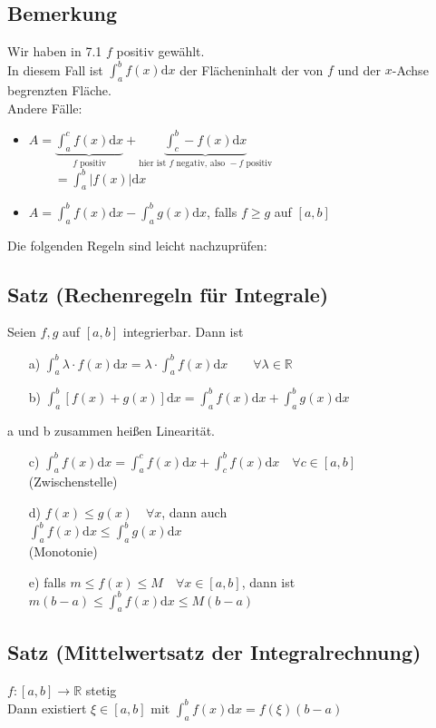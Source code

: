 \documentclass[12pt, titlepage]{article}
\newcommand{\R}{\mathds{R}}
\renewcommand{\>}{\rightarrow}
\renewcommand{\*}{\cdot}
\begin{document}
	\subsection{Bemerkung}
	Wir haben in 7.1 $f$ positiv gewählt.\\
	In diesem Fall ist $\int_{a}^{b}f(x)\textrm{d}x$ der Flächeninhalt der von $f$ und der $x$-Achse begrenzten Fläche.\\
	Andere Fälle:
	\begin{itemize}
		\item $A=\underbrace{\int_{a}^{c}f(x)\textrm{d}x}_{f\textrm{ positiv}}+\underbrace{\int_{c}^{b}-f(x)\textrm{d}x}_{\textrm{hier ist }f\textrm{ negativ, also }-f\textrm{ positiv}}$\\
		$\qquad=\int_{a}^{b}|f(x)|\textrm{d}x$
		\item $A=\int_{a}^{b}f(x)\textrm{d}x-\int_{a}^{b}g(x)\textrm{d}x$, falls $f\geq g$ auf $[a,b]$
	\end{itemize}
	Die folgenden Regeln sind leicht nachzuprüfen:\subsection{Satz (Rechenregeln für Integrale)}
	Seien $f,g$ auf $[a,b]$ integrierbar. Dann ist
	\begin{itemize}
		\item[a)] $\int_{a}^{b}\lambda\*f(x)\textrm{d}x=\lambda\*\int_{a}^{b}f(x)\textrm{d}x\qquad\forall\lambda\in\R$
		\item[b)] $\int_{a}^{b}[f(x)+g(x)]\textrm{d}x=\int_{a}^{b}f(x)\textrm{d}x+\int_{a}^{b}g(x)\textrm{d}x$
	\end{itemize}
	a und b zusammen heißen Linearität.
	\begin{itemize}
		\item[c)] $\int_{a}^{b}f(x)\textrm{d}x=\int_{a}^{c}f(x)\textrm{d}x+\int_{c}^{b}f(x)\textrm{d}x\quad\forall c\in[a,b]$\\
		(Zwischenstelle)
		\item[d)] $f(x)\leq g(x)\quad\forall x$, dann auch\\
		$\int_{a}^{b}f(x)\textrm{d}x\leq\int_{a}^{b}g(x)\textrm{d}x$\\
		(Monotonie)
		\item[e)] falls $m\leq f(x)\leq M\quad\forall x\in[a,b]$, dann ist \\
		$m(b-a)\leq\int_{a}^{b}f(x)\textrm{d}x\leq M(b-a)$\\
	\end{itemize}
	\subsection{Satz (Mittelwertsatz der Integralrechnung)}
	$f\colon[a,b]\>\R$ stetig\\
	Dann existiert $\xi\in[a,b]$ mit $\int_{a}^{b}f(x)\textrm{d}x=f(\xi)(b-a)$\\
\end{document}
